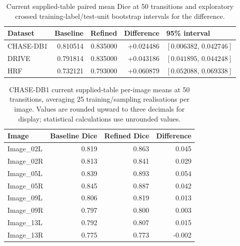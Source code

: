 \documentclass[jimaging,article,submit,pdftex,moreauthors]{Definitions/mdpi}%
\begin{document}
\begin{table}[htbp]
\centering
\caption{Current supplied-table paired mean Dice at 50 transitions and exploratory crossed training-label/test-unit bootstrap intervals for the difference.}
\label{tab:per_image_paired_intervals}
\scriptsize
\begin{tabular}{lrrrl}
\toprule
Dataset & Baseline & Refined & Difference & 95\% interval \\
\midrule
CHASE-DB1 & 0.810514 & 0.835000 & +0.024486 & $[0.006382,\,0.042746]$ \\
DRIVE & 0.791814 & 0.835000 & +0.043186 & $[0.041895,\,0.044248]$ \\
HRF & 0.732121 & 0.793000 & +0.060879 & $[0.052088,\,0.069338]$ \\
\bottomrule
\end{tabular}
\end{table}

\begin{table}[htbp]
\centering
\caption{CHASE-DB1 current supplied-table per-image means at 50 transitions, averaging 25 training/sampling realisations per image. Values are rounded upward to three decimals for display; statistical calculations use unrounded values.}
\label{tab:chase_per_image_corrected}
\scriptsize
\begin{tabular}{lrrr}
\toprule
Image & Baseline Dice & Refined Dice & Difference \\
\midrule
Image\_02L & 0.819 & 0.863 & 0.045 \\
Image\_02R & 0.813 & 0.841 & 0.029 \\
Image\_05L & 0.839 & 0.893 & 0.054 \\
Image\_05R & 0.845 & 0.887 & 0.042 \\
Image\_09L & 0.806 & 0.819 & 0.013 \\
Image\_09R & 0.797 & 0.800 & 0.003 \\
Image\_13L & 0.792 & 0.807 & 0.015 \\
Image\_13R & 0.775 & 0.773 & -0.002 \\
\bottomrule
\end{tabular}
\end{table}
\end{document}
